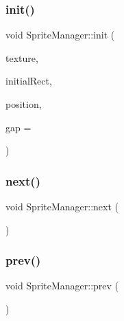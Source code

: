 \mbox{\label{class_sprite_manager_a6bc9f6b77d54099de6fcf84ec1e360bd}} 
\subsubsection{\texorpdfstring{init()}{init()}}
{\footnotesize\ttfamily void Sprite\+Manager\+::init (\begin{DoxyParamCaption}\item[{sf\+::\+Texture $\ast$}]{texture,  }\item[{const sf\+::\+Int\+Rect \&}]{initial\+Rect,  }\item[{const sf\+::\+Vector2f \&}]{position,  }\item[{int}]{gap = {} }\end{DoxyParamCaption})}

\mbox{\label{class_sprite_manager_acdcd181f96ed049db0bf445a71e4b6e2}} 
\subsubsection{\texorpdfstring{next()}{next()}}
{\footnotesize\ttfamily void Sprite\+Manager\+::next (\begin{DoxyParamCaption}{ }\end{DoxyParamCaption})}

\mbox{\label{class_sprite_manager_a45d2b2613bb95d34ce8e0ad28e261ef1}} 
\subsubsection{\texorpdfstring{prev()}{prev()}}
{\footnotesize\ttfamily void Sprite\+Manager\+::prev (\begin{DoxyParamCaption}{ }\end{DoxyParamCaption})}

\mbox{\label{class_sprite_manager_a9ef427743db56baec20673d877a63717}} 
